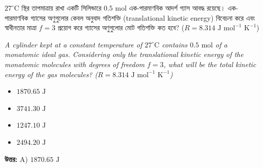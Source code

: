 \documentclass[12pt, a4paper]{article}
\begin{document}
\begin{tcolorbox}[questionbox={প্রশ্ন (Question) 15}]
    \noindent
    $27^\circ\text{C}$ স্থির তাপমাত্রায় রাখা একটি সিলিন্ডারে $0.5\text{ mol}$ এক-পারমাণবিক আদর্শ গ্যাস আবদ্ধ রয়েছে। এক-পারমাণবিক গ্যাসের অণুগুলোর কেবল অনুবাদ গতিশক্তি (translational kinetic energy) বিবেচনা করে এবং স্বাধীনতার মাত্রা $f = 3$ প্রয়োগ করে গ্যাসের অণুগুলোর মোট গতিশক্তি কত হবে? ($R = 8.314\text{ J mol}^{-1}\text{ K}^{-1}$)
    
    \vspace{0.8em}
    \begin{english}
    \noindent\textit{\color{darkgray}
    A cylinder kept at a constant temperature of $27^\circ\text{C}$ contains $0.5\text{ mol}$ of a monatomic ideal gas. Considering only the translational kinetic energy of the monatomic molecules with degrees of freedom $f = 3$, what will be the total kinetic energy of the gas molecules? ($R = 8.314\text{ J mol}^{-1}\text{ K}^{-1}$)
    }
    \end{english}
\end{tcolorbox}

\begin{itemize}[label={}, leftmargin=1cm, itemsep=0.5em]
    \item[\textbf{A)}] $1870.65\text{ J}$
    \item[\textbf{B)}] $3741.30\text{ J}$
    \item[\textbf{C)}] $1247.10\text{ J}$
    \item[\textbf{D)}] $2494.20\text{ J}$
\end{itemize}

\vspace{0.5em}
\begin{tcolorbox}[answerbox]
    \textbf{\color{success} উত্তর:} A) $1870.65\text{ J}$
\end{tcolorbox}
\vspace{1em}
\end{document}
